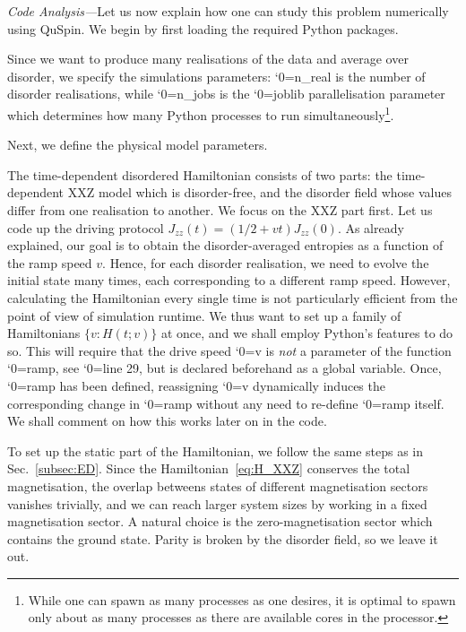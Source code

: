 \documentclass{SciPost}
\newcommand\0{\scalebox{-1}[1]{0}}
\let\svttfamily\ttfamily
\renewcommand\ttfamily{\svttfamily\catcode`0=\active }
\renewcommand\texttt{\bgroup\ttfamily\texttthelp}
\def\texttthelp#1{#1\egroup}
\begin{document}
\emph{Code Analysis---}Let us now explain how one can study this problem numerically using QuSpin. We begin by first loading the required Python packages. 

%
Since we want to produce many realisations of the data and average over disorder, we specify the simulations parameters: \texttt{n\_real} is the number of disorder realisations, while \texttt{n\_jobs} is the \texttt{joblib} parallelisation parameter which determines how many Python processes to run simultaneously\footnote{While one can spawn as many processes as one desires, it is optimal to spawn only about as many processes as there are available cores in the processor.}.

%
Next, we define the physical model parameters.  

%
The time-dependent disordered Hamiltonian consists of two parts: the time-dependent XXZ model which is disorder-free, and the disorder field whose values differ from one realisation to another. We focus on the XXZ part first. Let us code up the driving protocol $J_{zz}(t) = (1/2 + vt)J_{zz}(0)$. As already explained, our goal is to obtain the disorder-averaged entropies as a function of the ramp speed $v$. Hence, for each disorder realisation, we need to evolve the initial state many times, each corresponding to a different ramp speed. However, calculating the Hamiltonian every single time is not particularly efficient from the point of view of simulation runtime. We thus want to set up a family of Hamiltonians $\{v:H(t;v)\}$ at once, and we shall employ Python's features to do so. This will require that the drive speed \texttt{v} is \emph{not} a parameter of the function \texttt{ramp}, see \texttt{line 29}, but is declared beforehand as a global variable. Once, \texttt{ramp} has been defined, reassigning \texttt{v} dynamically induces the corresponding change in \texttt{ramp} without any need to re-define \texttt{ramp} itself. We shall comment on how this works later on in the code.   

%
To set up the static part of the Hamiltonian, we follow the same steps as in Sec.~\ref{subsec:ED}. Since the Hamiltonian~\eqref{eq:H_XXZ} conserves the total magnetisation, the overlap betweens states of different magnetisation sectors vanishes trivially, and we can reach larger system sizes by working in a fixed magnetisation sector. A natural choice is the zero-magnetisation sector which contains the ground state. Parity is broken by the disorder field, so we leave it out. 
\end{document}
